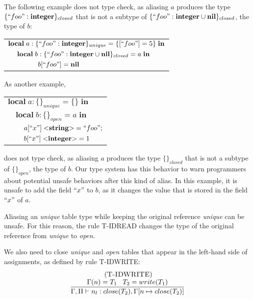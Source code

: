 The following example does not type check, as aliasing $a$ produces
the type $\{``foo":\mathbf{integer}\}_{closed}$ that is not a subtype of
$\{``foo":\mathbf{integer} \cup \mathbf{nil}\}_{closed}$, the type of $b$:
\begin{center}
\begin{tabular}{lll}
\multicolumn{3}{l}{$\mathbf{local} \; a:\{``foo":\mathbf{integer}\}_{unique} = \{ [``foo"] = 5 \} \; \mathbf{in}$}\\
& \multicolumn{2}{l}{$\mathbf{local} \; b:\{``foo":\mathbf{integer} \cup \mathbf{nil} \}_{closed} = a \; \mathbf{in}$}\\
& & \multicolumn{1}{l}{$b[``foo"] = \mathbf{nil}$}
\end{tabular}
\end{center}

As another example,
\begin{center}
\begin{tabular}{lll}
\multicolumn{3}{l}{$\mathbf{local} \; a:\{\}_{unique} = \{\} \; \mathbf{in}$}\\
& \multicolumn{2}{l}{$\mathbf{local} \; b:\{\}_{open} = a \; \mathbf{in}$}\\
& & \multicolumn{1}{l}{$a[``x"] \; {<}\mathbf{string}{>} = ``foo";$}\\
& & \multicolumn{1}{l}{$b[``x"] \; {<}\mathbf{integer}{>} = 1$}\\
\end{tabular}
\end{center}
does not type check, as aliasing $a$ produces the type $\{\}_{closed}$
that is not a subtype of $\{\}_{open}$, the type of $b$.
Our type system has this behavior to warn programmers about
potential unsafe behaviors after this kind of alias.
In this example, it is unsafe to add the field $``x"$ to $b$,
as it changes the value that is stored in the field $``x"$ of $a$.

Aliasing an \emph{unique} table type while keeping the original
reference \emph{unique} can be unsafe.
For this reason, the rule \textsc{T-IDREAD} changes the type of
the original reference from \emph{unique} to \emph{open}.

We also need to close \emph{unique} and \emph{open} tables that
appear in the left-hand side of assignments, as defined by
rule \textsc{T-IDWRITE}:
\[
\begin{array}{c}
\; (\textsc{T-IDWRITE})\\
\dfrac{\Gamma(n) = T_{1} \;\;\; T_{2} = write(T_{1})}
      {\Gamma, \Pi \vdash n_{l}:close(T_{2}), \Gamma[n \mapsto close(T_{2})]}
\end{array}
\]

